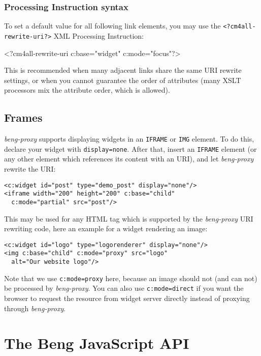 \documentclass[a4paper,12pt]{article}
\begin{document}
\subsubsection{Processing Instruction syntax}

To set a default value for all following link elements, you may use
the \texttt{<?cm4all-rewrite-uri?>} XML Processing Instruction:

\begin{verbatim*}
<?cm4all-rewrite-uri c:base="widget" c:mode="focus"?>
\end{verbatim*}

This is recommended when many adjacent links share the same URI
rewrite settings, or when you cannot guarantee the order of attributes
(many XSLT processors mix the attribute order, which is allowed).

\subsection{Frames}
\label{frames}

\emph{beng-proxy} supports displaying widgets in an \texttt{IFRAME} or
\texttt{IMG} element.  To do this, declare your widget with
\texttt{display=none}.  After that, insert an \texttt{IFRAME} element
(or any other element which references its content with an URI), and
let \emph{beng-proxy} rewrite the URI:

\begin{verbatim}
<c:widget id="post" type="demo_post" display="none"/>
<iframe width="200" height="200" c:base="child"
  c:mode="partial" src="post"/>
\end{verbatim}

This may be used for any HTML tag which is supported by the
\emph{beng-proxy} URI rewriting code, here an example for a widget
rendering an image:

\begin{verbatim}
<c:widget id="logo" type="logorenderer" display="none"/>
<img c:base="child" c:mode="proxy" src="logo"
  alt="Our website logo"/>
\end{verbatim}

Note that we use \texttt{c:mode=proxy} here, because an image should
not (and can not) be processed by \emph{beng-proxy}.  You can also use
\texttt{c:mode=direct} if you want the browser to request the resource
from widget server directly instead of proxying through
\emph{beng-proxy}.


\section{The Beng JavaScript API}
\end{document}
